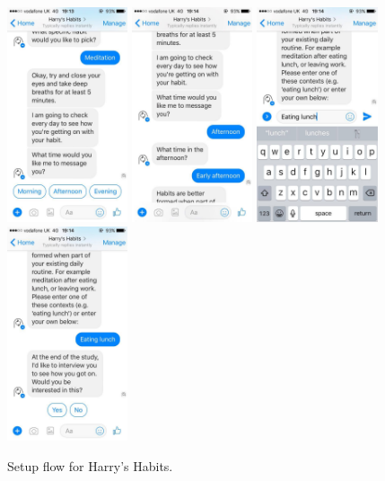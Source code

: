 \begin{figure}[H]
  \newline
  \newline
  \includegraphics[width=1.4in]{resources/design/process/9.jpg}
  \hspace{10px}
  \includegraphics[width=1.4in]{resources/design/process/10.jpg}
  \hspace{10px}
  \includegraphics[width=1.4in]{resources/design/process/11.jpg}
  \hspace{10px}
  \includegraphics[width=1.4in]{resources/design/process/12.jpg}
  \caption{Setup flow for Harry's Habits.}
  \label{fig:setup_flow_screenshots}
\end{figure}


